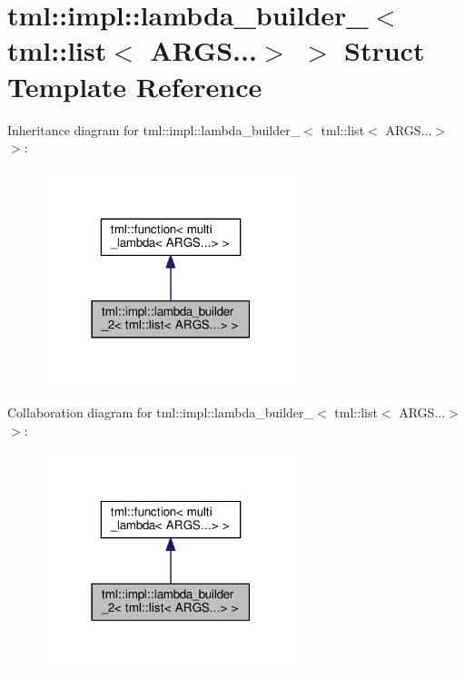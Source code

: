 \hypertarget{structtml_1_1impl_1_1lambda__builder__2_3_01tml_1_1list_3_01_a_r_g_s_8_8_8_4_01_4}{\section{tml\+:\+:impl\+:\+:lambda\+\_\+builder\+\_$<$ tml\+:\+:list$<$ A\+R\+G\+S...$>$ $>$ Struct Template Reference}
\label{structtml_1_1impl_1_1lambda__builder__2_3_01tml_1_1list_3_01_a_r_g_s_8_8_8_4_01_4}
}


Inheritance diagram for tml\+:\+:impl\+:\+:lambda\+\_\+builder\+\_$<$ tml\+:\+:list$<$ A\+R\+G\+S...$>$ $>$\+:
\nopagebreak
\begin{figure}[H]
\begin{center}
\leavevmode
\includegraphics[width=210pt]{structtml_1_1impl_1_1lambda__builder__2_3_01tml_1_1list_3_01_a_r_g_s_8_8_8_4_01_4__inherit__graph}
\end{center}
\end{figure}


Collaboration diagram for tml\+:\+:impl\+:\+:lambda\+\_\+builder\+\_$<$ tml\+:\+:list$<$ A\+R\+G\+S...$>$ $>$\+:
\nopagebreak
\begin{figure}[H]
\begin{center}
\leavevmode
\includegraphics[width=210pt]{structtml_1_1impl_1_1lambda__builder__2_3_01tml_1_1list_3_01_a_r_g_s_8_8_8_4_01_4__coll__graph}
\end{center}
\end{figure}
